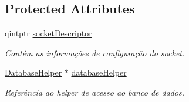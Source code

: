 \subsection*{Protected Attributes}
\begin{DoxyCompactItemize}
\item 
qintptr \hyperlink{classWorkerThreadImpl_af3d6cf4437a92a4dbdf8c07a474a671b}{socket\+Descriptor}\hypertarget{classWorkerThreadImpl_af3d6cf4437a92a4dbdf8c07a474a671b}{}\label{classWorkerThreadImpl_af3d6cf4437a92a4dbdf8c07a474a671b}

\begin{DoxyCompactList}\small\item\em Contém as informações de configuração do socket. \end{DoxyCompactList}\item 
\hyperlink{classDatabaseHelper}{Database\+Helper} $\ast$ \hyperlink{classWorkerThreadImpl_a6a64f8daf91e56abf94c5a92bfc0fb88}{database\+Helper}\hypertarget{classWorkerThreadImpl_a6a64f8daf91e56abf94c5a92bfc0fb88}{}\label{classWorkerThreadImpl_a6a64f8daf91e56abf94c5a92bfc0fb88}

\begin{DoxyCompactList}\small\item\em Referência ao helper de acesso ao banco de dados. \end{DoxyCompactList}\end{DoxyCompactItemize}
